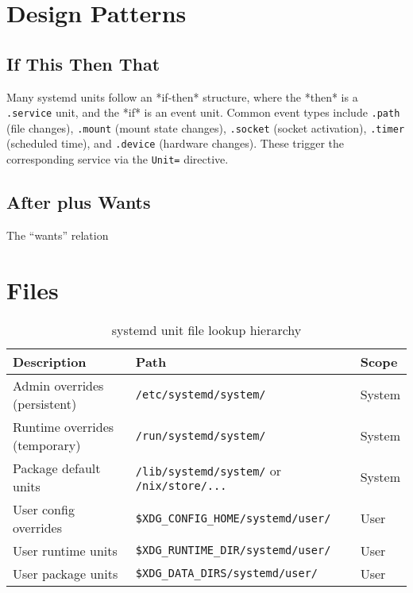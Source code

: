 \documentclass[openany, 12pt]{book}
\begin{document}
\chapter{Design Patterns}

\section{If This Then That}
Many systemd units follow an *if-then* structure, where the *then* is a
\texttt{.service} unit, and the *if* is an event unit. Common event types include
\texttt{.path} (file changes), \texttt{.mount} (mount state changes),
\texttt{.socket} (socket activation), \texttt{.timer} (scheduled time),
and \texttt{.device} (hardware changes). These trigger the corresponding
service via the \texttt{Unit=} directive.

\section{After plus Wants}
The ``wants'' relation

\chapter{Files}
\begin{table}[h]
	\centering
	\begin{tabular}{@{}lll@{}}
		\toprule
		\textbf{Description}          & \textbf{Path}                                            & \textbf{Scope} \\ \midrule
		Admin overrides (persistent)  & \texttt{/etc/systemd/system/}                            & System         \\
		Runtime overrides (temporary) & \texttt{/run/systemd/system/}                            & System         \\
		Package default units         & \texttt{/lib/systemd/system/} or \texttt{/nix/store/...} & System         \\
		User config overrides         & \texttt{\$XDG\_CONFIG\_HOME/systemd/user/}               & User           \\
		User runtime units            & \texttt{\$XDG\_RUNTIME\_DIR/systemd/user/}               & User           \\
		User package units            & \texttt{\$XDG\_DATA\_DIRS/systemd/user/}                 & User           \\
		\bottomrule
	\end{tabular}
	\caption{systemd unit file lookup hierarchy}
\end{table}
\end{document}
